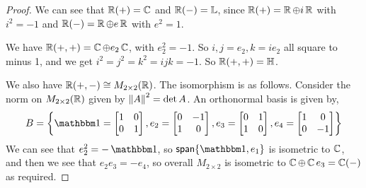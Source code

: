 \begin{proof}
    We can see that $\RR(+)=\CC$ and $\RR(-)=\LL$, since $\RR(+) = \RR\oplus i\RR$ with $i^2=-1$ and $\RR(-)=\RR\oplus e\RR$ with $e^2=1$.

    We have $\RR(+,+)=\CC\oplus e_2\CC$, with $e_2^2 = -1$. So $i, j=e_2, k= ie_2$ all square to minus 1, and we get $i^2=j^2=k^2=ijk = -1$. So $\RR(+,+) = \HH$.

    We also have $\RR(+,-) \cong M_{2\times 2}(\RR)$. The isomorphism is as follows.
    Consider the norm on $M_{2\times 2}(\RR)$ given by $\norm{A}^2 = \det A$. An orthonormal basis is given by,
    \[B = \left\{\One=\m{1&0\\0&1},e_2= \m{0&-1\\1&0},e_3=\m{0&1\\1&0},e_4=\m{1&0\\0&-1}\right\}\]
    We can see that $e_2^2=-\One$, so $\Span\{\One,e_1\}$ is isometric to $\CC$, and then we see that $e_2 e_3 = -e_4$, so overall $M_{2\times 2}$ is isometric to $\CC\oplus \CC e_3 = \CC(-)$ as required.
\end{proof}

